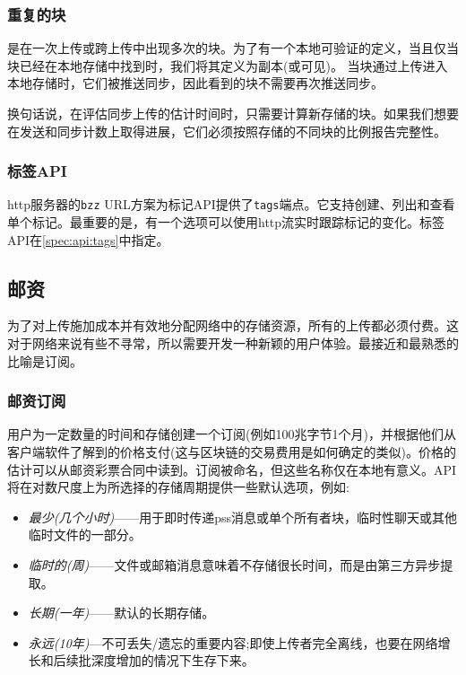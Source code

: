 \subsubsection{重复的块}

是在一次上传或跨上传中出现多次的块。为了有一个本地可验证的定义，当且仅当块已经在本地存储中找到时，我们将其定义为副本(或可见)。
当块通过上传进入本地存储时，它们被推送同步，因此看到的块不需要再次推送同步。

换句话说，在评估同步上传的估计时间时，只需要计算新存储的块。如果我们想要在发送和同步计数上取得进展，它们必须按照存储的不同块的比例报告完整性。

\subsubsection{标签API} 

http服务器的\lstinline{bzz} URL方案为标记API提供了\lstinline{tags}端点。它支持创建、列出和查看单个标记。最重要的是，有一个选项可以使用http流实时跟踪标记的变化。标签API在\ref{spec:api:tags}中指定。



\subsection{邮资\statusgreen}\label{sec:postage-ux}

为了对上传施加成本并有效地分配网络中的存储资源，所有的上传都必须付费。这对于网络来说有些不寻常，所以需要开发一种新颖的用户体验。最接近和最熟悉的比喻是订阅。

\subsubsection{邮资订阅}

用户为一定数量的时间和存储创建一个订阅(例如100兆字节1个月)，并根据他们从客户端软件了解到的价格支付(这与区块链的交易费用是如何确定的类似)。价格的估计可以从邮资彩票合同中读到。订阅被命名，但这些名称仅在本地有意义。API将在对数尺度上为所选择的存储周期提供一些默认选项，例如: 

\begin{itemize}
\item \emph{最少(几个小时)}——用于即时传递pss消息或单个所有者块，临时性聊天或其他临时文件的一部分。
\item \emph{临时的(周)}——文件或邮箱消息意味着不存储很长时间，而是由第三方异步提取。
\item \emph{长期(一年)}——默认的长期存储。 
\item \emph{永远(10年)}—不可丢失/遗忘的重要内容;即使上传者完全离线，也要在网络增长和后续批深度增加的情况下生存下来。
\end{itemize}

